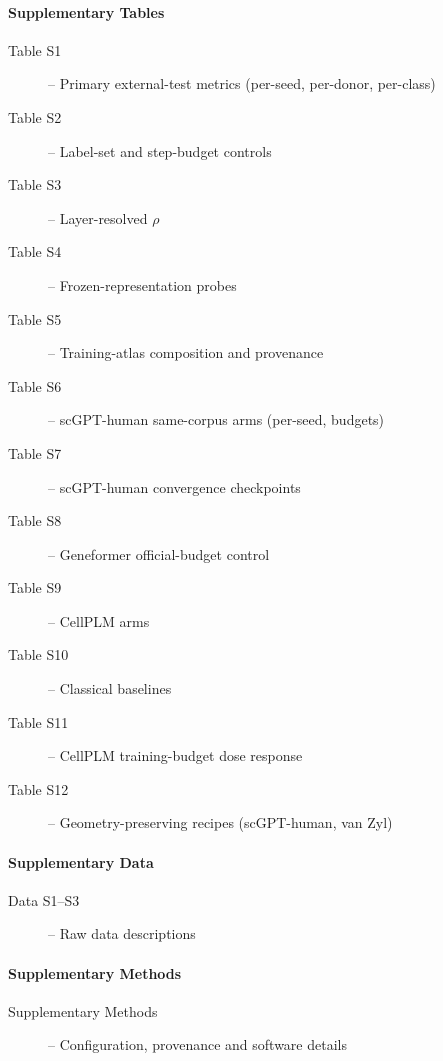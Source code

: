 \documentclass[12pt,a4paper]{article}
\begin{document}
\paragraph*{Supplementary Tables}
\begin{description}
  \item[Table S1]\hfill\pageref{tab:S1} -- Primary external-test metrics (per-seed, per-donor, per-class)
  \item[Table S2]\hfill\pageref{tab:S2} -- Label-set and step-budget controls
  \item[Table S3]\hfill\pageref{tab:S3} -- Layer-resolved $\rho$
  \item[Table S4]\hfill\pageref{tab:S4} -- Frozen-representation probes
  \item[Table S5]\hfill\pageref{tab:S5} -- Training-atlas composition and provenance
  \item[Table S6]\hfill\pageref{tab:S6} -- scGPT-human same-corpus arms (per-seed, budgets)
  \item[Table S7]\hfill\pageref{tab:S7} -- scGPT-human convergence checkpoints
  \item[Table S8]\hfill\pageref{tab:S8} -- Geneformer official-budget control
  \item[Table S9]\hfill\pageref{tab:S9} -- CellPLM arms
  \item[Table S10]\hfill\pageref{tab:S10} -- Classical baselines
  \item[Table S11]\hfill\pageref{tab:S11} -- CellPLM training-budget dose response
  \item[Table S12]\hfill\pageref{tab:S12} -- Geometry-preserving recipes (scGPT-human, van Zyl)
\end{description}

\paragraph*{Supplementary Data}
\begin{description}
  \item[Data S1--S3]\hfill\pageref{sec:data} -- Raw data descriptions
\end{description}

\paragraph*{Supplementary Methods}
\begin{description}
  \item[Supplementary Methods]\hfill\pageref{sec:suppmethods} -- Configuration, provenance and software details
\end{description}
\end{document}
